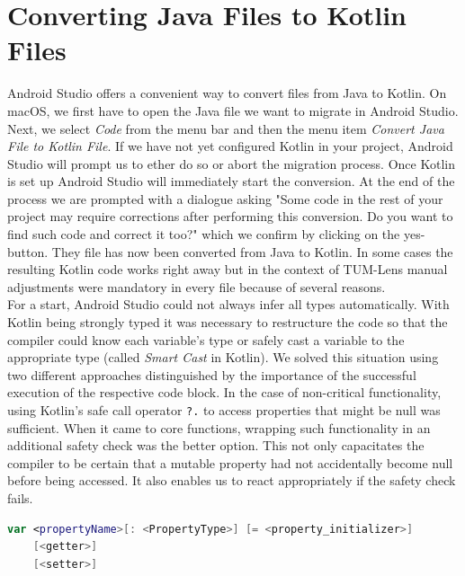 \documentclass[
			   fontsize=11pt,
               paper=a4,
               bibliography=totoc,
               idxtotoc,
               headsepline,
               footsepline,
               footinclude=false,
               BCOR=12mm,
               DIV=13,
               openany,   %
               ]
               {scrbook}
\newcommand{\code}[1]{\lstinline[basicstyle = \ttfamily\small]{#1}} %
\begin{document}
\section{Converting Java Files to Kotlin Files}

Android Studio offers a convenient way to convert files from Java to Kotlin. On macOS, we first have to open the Java file we want to migrate in Android Studio. Next, we select \textit{Code} from the menu bar and then the menu item \textit{Convert Java File to Kotlin File}. If we have not yet configured Kotlin in your project, Android Studio will prompt us to ether do so or abort the migration process. Once Kotlin is set up Android Studio will immediately start the conversion. At the end of the process we are prompted with a dialogue asking "Some code in the rest of your project may require corrections after performing this conversion. Do you want to find such code and correct it too?" which we confirm by clicking on the yes-button. They file has now been converted from Java to Kotlin. In some cases the resulting Kotlin code works right away but in the context of TUM-Lens manual adjustments were mandatory in every file because of several reasons. \\

For a start, Android Studio could not always infer all types automatically. With Kotlin being strongly typed it was necessary to restructure the code so that the compiler could know each variable's type or safely cast a variable to the appropriate type (called \textit{Smart Cast} in Kotlin). We solved this situation using two different approaches distinguished by the importance of the successful execution of the respective code block. In the case of non-critical functionality, using Kotlin's safe call operator \code{?.} to access properties that might be null was sufficient. When it came to core functions, wrapping such functionality in an additional safety check was the better option. This not only capacitates the compiler to be certain that a mutable property had not accidentally become null before being accessed. It also enables us to react appropriately if the safety check fails. \\

\begin{lstlisting}[style=standard, language=Kotlin, label=code:kotlinProperty, caption={Kotlin's declaration syntax for a mutable property. Getter and setter are optional. The property type is only optional when the compiler can infer it from the context (meaning either from the initializer or from the return type of the getter).}]
var <propertyName>[: <PropertyType>] [= <property_initializer>]
	[<getter>]
	[<setter>]
\end{lstlisting}
\end{document}
